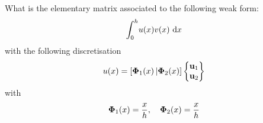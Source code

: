 \bexo

What is the elementary matrix associated to the following weak form:
\begin{equation}
	\displaystyle{\int_{0}^h} u(x)v(x)\,\,\textrm{d} x 
\end{equation}
with the following discretisation
\begin{equation}
	u(x)=[\boldsymbol{\Phi}_1(x)\, | \boldsymbol{\Phi}_2(x)]
	\begin{Bmatrix}
		\textbf{u}_1\\
		\textbf{u}_2
	\end{Bmatrix}
\end{equation}
with 
\begin{equation}
	\boldsymbol{\Phi}_1(x)=\dfrac{x}{h} , \quad \boldsymbol{\Phi}_2(x)=\dfrac{x}{h}
\end{equation}

\eexo

